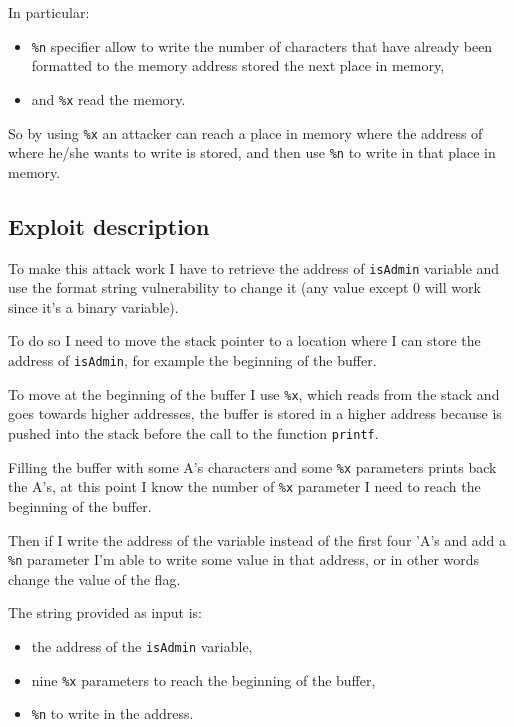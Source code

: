 \documentclass[a4paper,12pt]{article}
\begin{document}
In particular:
\begin{itemize}
\item \texttt{\%n} specifier allow to write the number of characters that have already been formatted to the memory address stored the next place in memory,
\item and \texttt{\%x} read the memory.
\end{itemize} 

So by using \texttt{\%x} an attacker can reach a place in memory where the address of where he/she wants to write is stored, and then use \texttt{\%n} to write in that place in memory.


\subsection{Exploit description}

To make this attack work I have to retrieve the address of \texttt{isAdmin} variable and use the format string vulnerability to change it (any value except 0 will work since it's a binary variable). 

To do so I need to move the stack pointer to a location where I can store the address of \texttt{isAdmin}, for example the beginning of the buffer.

To move at the beginning of the buffer I use \texttt{\%x}, which reads from the stack and goes towards higher addresses, the buffer is stored in a higher address because is pushed into the stack before the call to the function \texttt{printf}.

Filling the buffer with some A's characters and some \texttt{\%x} parameters %
prints back the A's, at this point I know the number of \texttt{\%x} parameter I need to reach the beginning of the buffer.

Then if I write the address of the variable instead of the first four 'A's and add a \texttt{\%n} parameter I'm able to write some value in that address, or in other words change the value of the flag.

The string provided as input is:
\begin{itemize}
\item the address of the \texttt{isAdmin} variable,
\item nine \texttt{\%x} parameters to reach the beginning of the buffer,
\item \texttt{\%n} to write in the address.
\end{itemize}
\end{document}
